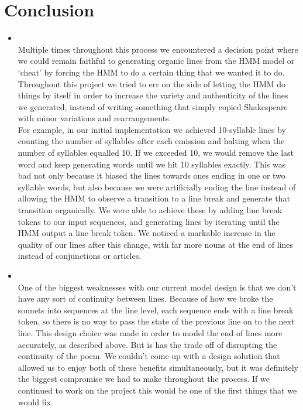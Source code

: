 \section{Conclusion}
\medskip
\begin{itemize}

    \item {} \\

    Multiple times throughout this process we encountered a decision point 
    where we could remain faithful to generating organic lines from the HMM
    model or `cheat' by forcing the HMM to do a certain thing that we wanted it
    to do. Throughout this project we tried to err on the side of letting the 
    HMM do things by itself in order to increase the variety and authenticity
    of the lines we generated, instead of writing something that simply copied
    Shakespeare with minor variations and rearrangements. \\

    For example, in our initial implementation we achieved 10-syllable lines
    by counting the number of syllables after each emission and halting when
    the number of syllables equalled 10. If we exceeded 10, we would remove
    the last word and keep generating words until we hit 10 syllables exactly.
    This was bad not only because it biased the lines towards ones ending in
    one or two syllable words, but also because we were artificially ending
    the line instead of allowing the HMM to observe a transition to a line break
    and generate that transition organically. We were able to achieve these by
    adding line break tokens to our input sequences, and generating lines by
    iterating until the HMM output a line break token. We noticed a markable
    increase in the quality of our lines after this change, with far more
    nouns at the end of lines instead of conjunctions or articles.


    \item {} \\
    
    One of the biggest weaknesses with our current model design is that we 
    don't have any sort of continuity between lines. Because of how we broke
    the sonnets into sequences at the line level, each sequence ends with a 
    line break token, so there is no way to pass the state of the previous
    line on to the next line. This design choice was made in order to model
    the end of lines more accurately, as described above. But is has the trade
    off of disrupting the continuity of the poem. We couldn't come up with a
    design solution that allowed us to enjoy both of these benefits simultaneously,
    but it was definitely the biggest compromise we had to make throughout the 
    process. If we continued to work on the project this would be one of the
    first things that we would fix. 


\end{itemize}
